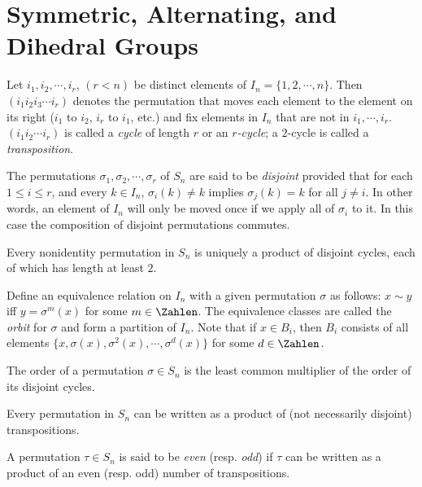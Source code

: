 \section{Symmetric, Alternating, and Dihedral Groups}
\begin{definition}
	Let $ i_1,i_2,\cdots, i_r $, $ (r<n) $ be distinct elements of $ I_n=\{1,2,\cdots,n \} $. Then $ (i_1 i_2 i_3 \cdots i_r) $ denotes the permutation that moves each element to the element on its right ($ i_1 $ to $ i_2 $, $ i_r $ to $ i_1 $, etc.) and fix elements in $ I_n $ that are not in $ i_1 ,\cdots,i_r$. $ (i_1i_2 \cdots i_r) $ is called a \textit{cycle} of length $ r $ or an \textit{$ r $-cycle}; a $ 2 $-cycle is called a \textit{transposition}.
\end{definition}
\begin{definition}
	The permutations $ \sigma_1,\sigma_2,\cdots,\sigma_r $ of $ S_n $ are said to be \textit{disjoint} provided that for each $ 1\leqslant i \leqslant r $, and every $ k\in I_n $, $ \sigma_i(k)\neq k $ implies $ \sigma_j(k)=k $ for all $ j \neq i $. In other words, an element of $ I_n $ will only be moved once if we apply all of $ \sigma_i$ to it. In this case the composition of disjoint permutations commutes.
\end{definition}
\begin{theorem}
	Every nonidentity permutation in $ S_n $ is uniquely a product of disjoint cycles, each of which has length at least $ 2 $.
\end{theorem}
\begin{definition}
	Define an equivalence relation on $ I_n $ with a given permutation $ \sigma $ as follows: $ x \sim y $ iff $ y=\sigma^m(x) $ for some $ m \in \Zahlen $. The equivalence classes are called the \textit{orbit} for $ \sigma $ and form a partition of $ I_n $. Note that if $ x \in B_i $, then $ B_i $ consists of all elements $ \{x, \sigma(x),\sigma^2(x),\cdots,\sigma^d(x) \} $ for some $ d \in \Zahlen $.
\end{definition}
\begin{Corollary}
	The order of a permutation $ \sigma \in S_n $ is the least common multiplier of the order of its disjoint cycles.
\end{Corollary}
\begin{Corollary}
	Every permutation in $ S_n $ can be written as a product of (not necessarily disjoint) transpositions.
\end{Corollary}
\begin{definition}
	A permutation $ \tau \in S_n $ is said to be \textit{even} (resp. \textit{odd}) if $ \tau $ can be written as a product of an even (resp. odd) number of transpositions.
\end{definition}
